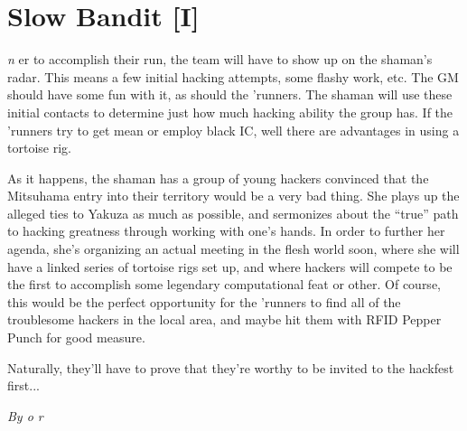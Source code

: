 \documentclass[letterpaper,twocolumn,10.5pt]{article}
\newenvironment{scenario}[6]
	{
		\section{#1 {\small[#2]}}
		\textit{#3}
		\def\TMPSCENARIO{#4 #5}
	}
	{\small\textit{By \TMPSCENARIO}}
\begin{document}
\begin{scenario}{Slow Bandit}
In order to accomplish their run, the team will have to show up on the shaman's radar. This means a few initial hacking attempts, some flashy work, etc. The GM should have some fun with it, as should the 'runners. The shaman will use these initial contacts to determine just how much hacking ability the group has. If the 'runners try to get mean or employ black IC, well there are advantages in using a tortoise rig.

As it happens, the shaman has a group of young hackers convinced that the Mitsuhama entry into their territory would be a very bad thing. She plays up the alleged ties to Yakuza as much as possible, and sermonizes about the ``true'' path to hacking greatness through working with one's hands. In order to further her agenda, she's organizing an actual meeting in the flesh world soon, where she will have a linked series of tortoise rigs set up, and where hackers will compete to be the first to accomplish some legendary computational feat or other. Of course, this would be the perfect opportunity for the 'runners to find all of the troublesome hackers in the local area, and maybe hit them with RFID Pepper Punch for good measure.

Naturally, they'll have to prove that they're worthy to be invited to the hackfest first... 

\end{scenario}
\end{document}
